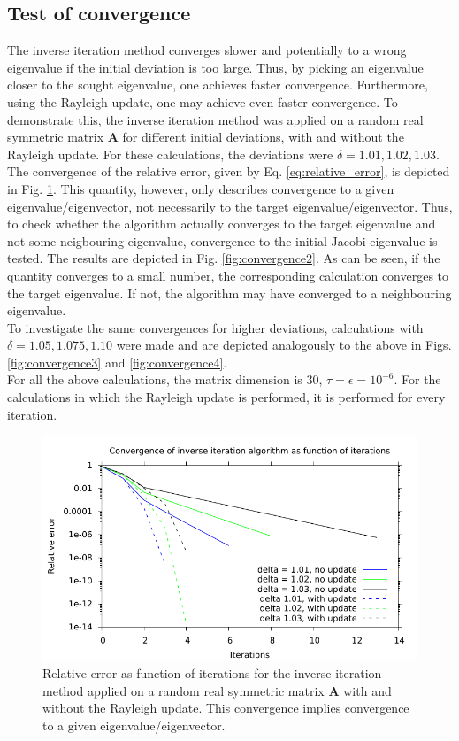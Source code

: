 \documentclass{article}
\begin{document}
	\subsection*{Test of convergence}
	The inverse iteration method converges slower and potentially to a wrong eigenvalue if the initial deviation is too large. Thus, by picking an eigenvalue closer to the sought eigenvalue, one achieves faster convergence. Furthermore, using the Rayleigh update, one may achieve even faster convergence. To demonstrate this, the inverse iteration method was applied on a random real symmetric matrix $\mathbf{A}$ for different initial deviations, with and without the Rayleigh update. For these calculations, the deviations were $\delta=1.01,1.02,1.03$. The convergence of the relative error, given by Eq. \ref{eq:relative_error}, is depicted in Fig. \ref{fig:convergence}. This quantity, however, only describes convergence to a given eigenvalue/eigenvector, not necessarily to the target eigenvalue/eigenvector. Thus, to check whether the algorithm actually converges to the target eigenvalue and not some neigbouring eigenvalue, convergence to the initial Jacobi eigenvalue is tested. The results are depicted in Fig. \ref{fig:convergence2}. As can be seen, if the quantity converges to a small number, the corresponding calculation converges to the target eigenvalue. If not, the algorithm may have converged to a neighbouring eigenvalue.\\
	To investigate the same convergences for higher deviations, calculations with $\delta=1.05,1.075,1.10$ were made and are depicted analogously to the above in Figs. \ref{fig:convergence3} and \ref{fig:convergence4}.\\
	For all the above calculations, the matrix dimension is 30, $\tau=\epsilon=10^{-6}$. For the calculations in which the Rayleigh update is performed, it is performed for every iteration.
	\begin{figure}
		\includegraphics[]{../Convergence.pdf}
		\caption{Relative error as function of iterations for the inverse iteration method applied on a random real symmetric matrix $\mathbf{A}$ with and without the Rayleigh update. This convergence implies convergence to a given eigenvalue/eigenvector.}
		\label{fig:convergence}
	\end{figure}
\end{document}
